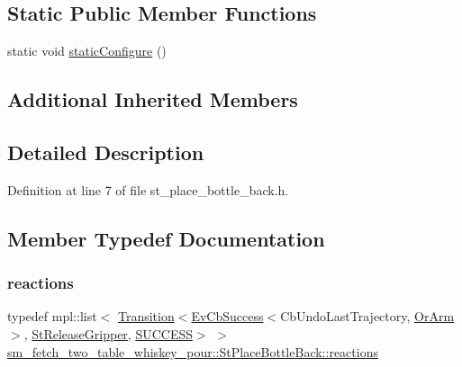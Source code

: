 \subsection*{Static Public Member Functions}
\begin{DoxyCompactItemize}
\item 
static void \hyperlink{structsm__fetch__two__table__whiskey__pour_1_1StPlaceBottleBack_a1b0db1da101544849f0fc73d5090e6e3}{static\+Configure} ()
\end{DoxyCompactItemize}
\subsection*{Additional Inherited Members}


\subsection{Detailed Description}


Definition at line 7 of file st\+\_\+place\+\_\+bottle\+\_\+back.\+h.



\subsection{Member Typedef Documentation}
\mbox{\label{structsm__fetch__two__table__whiskey__pour_1_1StPlaceBottleBack_ac9775454d1927c31daf52739c002a103}} 
\subsubsection{\texorpdfstring{reactions}{reactions}}
{\footnotesize\ttfamily typedef mpl\+::list$<$ \hyperlink{classsmacc_1_1Transition}{Transition}$<$\hyperlink{structsmacc_1_1EvCbSuccess}{Ev\+Cb\+Success}$<$Cb\+Undo\+Last\+Trajectory, \hyperlink{classsm__fetch__two__table__whiskey__pour_1_1OrArm}{Or\+Arm}$>$, \hyperlink{structsm__fetch__two__table__whiskey__pour_1_1StReleaseGripper}{St\+Release\+Gripper}, \hyperlink{structsmacc_1_1default__transition__tags_1_1SUCCESS}{S\+U\+C\+C\+E\+SS}$>$ $>$ \hyperlink{structsm__fetch__two__table__whiskey__pour_1_1StPlaceBottleBack_ac9775454d1927c31daf52739c002a103}{sm\+\_\+fetch\+\_\+two\+\_\+table\+\_\+whiskey\+\_\+pour\+::\+St\+Place\+Bottle\+Back\+::reactions}}




